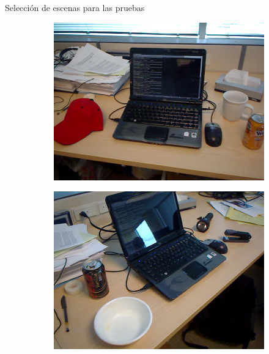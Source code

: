 \documentclass[]{beamer}
\begin{document}
\begin{frame}{Selección de escenas para las pruebas}
    \begin{figure}
        \centering
        \begin{subfigure}{0.45\textwidth}
            \centering
            \includegraphics[scale=0.2]{img/escenas/desk_1.png}
        \end{subfigure}
        \begin{subfigure}{0.45\textwidth}
            \centering
            \includegraphics[scale=0.2]{img/escenas/desk_2.png}
        \end{subfigure}


\end{figure}
\end{frame}
\end{document}
